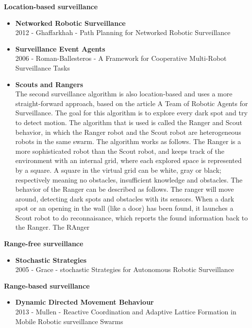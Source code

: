 \textbf{Location-based surveillance}
\begin{itemize}
\item \textbf{Networked Robotic Surveillance}\\
	2012 - Ghaffarkhah - Path Planning for Networked Robotic Surveillance
\item \textbf{Surveillance Event Agents}\\
	2006 - Roman-Ballesteros - A Framework for Cooperative Multi-Robot Surveillance Tasks
\item \textbf{Scouts and Rangers}\\
The second surveillance algorithm is also location-based and uses a more straight-forward approach, based on the article A Team of Robotic Agents for Surveillance.  \cite{Rybsky200}
The goal for this algorithm is to explore every dark spot and try to detect motion. 
The algorithm that is used is called the Ranger and Scout behavior, in which the Ranger robot and the Scout robot are heterogeneous robots in the same swarm. 
The algorithm works as follows. The Ranger is a more sophisticated robot than the Scout robot, and keeps track of the environment with an internal grid, where each explored space is represented by a square. 
A square in the virtual grid can be white, gray or black; respectively meaning no obstacles, insufficient knowledge and obstacles. 
The behavior of the Ranger can be described as follows. The ranger will move around, detecting dark spots and obstacles with its sensors.
When a dark spot or an opening in the wall (like a door) has been found, it launches a Scout robot to do reconnaisance, which reports the found information back to the Ranger. 
The RAnger
\end{itemize}

\textbf{Range-free surveillance}
\begin{itemize}
\item \textbf{Stochastic Strategies}\\
	2005 - Grace - stochastic Strategies for Autonomous Robotic Surveillance
\end{itemize}

\textbf{Range-based surveillance}
\begin{itemize}
\item \textbf{Dynamic Directed Movement Behaviour}\\
	2013 - Mullen - Reactive Coordination and Adaptive Lattice Formation in Mobile Robotic surveillance Swarms
\end{itemize}

